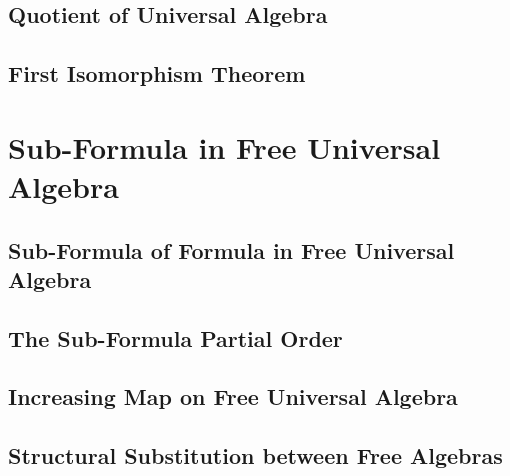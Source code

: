     \subsection{Quotient of Universal Algebra}
      
    \subsection{First Isomorphism Theorem}
      
\section{Sub-Formula in Free Universal Algebra}
    \subsection{Sub-Formula of Formula in Free Universal Algebra}
      
    \subsection{The Sub-Formula Partial Order}
      
    \subsection{Increasing Map on Free Universal Algebra}
      
    \subsection{Structural Substitution between Free Algebras}
      

